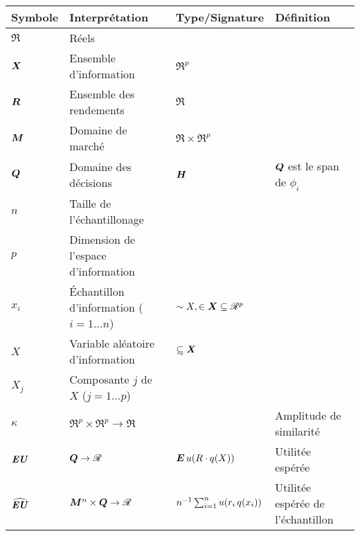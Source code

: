\begin{tabular}{llll}
  \toprule
  Symbole & Interprétation & Type/Signature & Définition\\
  \midrule
  $\Re$ & Réels & & \\
  $\bm{X}$ & Ensemble d'information & $\Re^p$ & \\
  $\bm{R}$ & Ensemble des rendements& $\Re$ & \\
  $\bm M$ & Domaine de marché & $\Re \times \Re^p$\\
  $\bm Q$ & Domaine des décisions & $\bm H$ & $\bm Q$ est le span de $\phi_i$\\
  $n$ & Taille de l'échantillonage \\
  $p$ & Dimension de l'espace d'information\\
  $x_i$ & Échantillon d'information ($i=1\ldots n$) & $\sim X, \in \bm{X} \subseteq \mathscr{R}^p$\\
  $X$ & Variable aléatoire d'information & $\subsetsim \X$\\
  $X_j$ & Composante $j$ de $X$ ($j=1\ldots p$)\\
  $\kappa$ & $\Re^p \times \Re^p \to \Re$ & & Amplitude de similarité\\
  $\textbf{\textit{EU}}$ & $\bm Q \to \mathscr{R}$ &$\bm E\,u(R \cdot q(X))$ &  Utilitée espérée\\
  $\widehat{\textbf{\textit{EU}}}$ & $\bm M^n \times \bm Q \to \mathscr{R}$ & $n^{-1}\sum_{i=1}^n u(r_i\,q(x_i))$ &  Utilitée espérée
                                                                   de l'échantillon\\
  
  
  \bottomrule
\end{tabular}


